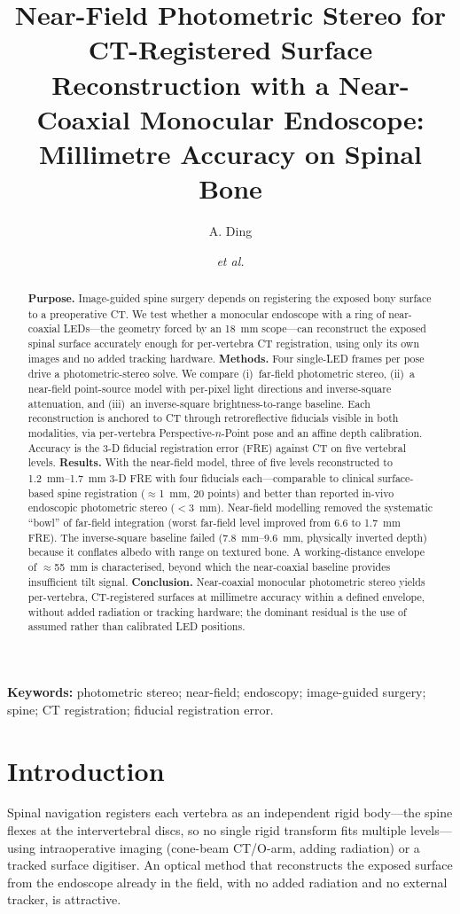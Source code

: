 \documentclass[11pt]{article}
\title{\bfseries Near-Field Photometric Stereo for CT-Registered Surface
Reconstruction with a Near-Coaxial Monocular Endoscope: Millimetre Accuracy on
Spinal Bone}
\author[1]{A. Ding}
\author[1]{\textit{et al.}}
\affil[1]{\small (affiliation to be completed)}
\date{}
\begin{document}
\maketitle

\begin{abstract}
\noindent\textbf{Purpose.} Image-guided spine surgery depends on registering the
exposed bony surface to a preoperative CT. We test whether a monocular endoscope
with a ring of near-coaxial LEDs---the geometry forced by an \SI{18}{\mm} scope---can
reconstruct the exposed spinal surface accurately enough for per-vertebra CT
registration, using only its own images and no added tracking hardware.
\textbf{Methods.} Four single-LED frames per pose drive a photometric-stereo solve.
We compare (i)~far-field photometric stereo, (ii)~a near-field point-source model
with per-pixel light directions and inverse-square attenuation, and (iii)~an
inverse-square brightness-to-range baseline. Each reconstruction is anchored to CT
through retroreflective fiducials visible in both modalities, via per-vertebra
Perspective-$n$-Point pose and an affine depth calibration. Accuracy is the 3-D
fiducial registration error (FRE) against CT on five vertebral levels.
\textbf{Results.} With the near-field model, three of five levels reconstructed to
\SIrange{1.2}{1.7}{\mm} 3-D FRE with four fiducials each---comparable to clinical
surface-based spine registration ($\approx$\SI{1}{\mm}, 20 points) and better than
reported in-vivo endoscopic photometric stereo ($<$\SI{3}{\mm}). Near-field
modelling removed the systematic ``bowl'' of far-field integration (worst far-field
level improved from \num{6.6} to \SI{1.7}{\mm} FRE). The inverse-square baseline
failed (\SIrange{7.8}{9.6}{\mm}, physically inverted depth) because it conflates
albedo with range on textured bone. A working-distance envelope of $\approx$\SI{55}{\mm}
is characterised, beyond which the near-coaxial baseline provides insufficient tilt
signal.
\textbf{Conclusion.} Near-coaxial monocular photometric stereo yields per-vertebra,
CT-registered surfaces at millimetre accuracy within a defined envelope, without
added radiation or tracking hardware; the dominant residual is the use of assumed
rather than calibrated LED positions.
\end{abstract}

\noindent\textbf{Keywords:} photometric stereo; near-field; endoscopy; image-guided
surgery; spine; CT registration; fiducial registration error.

\section{Introduction}
Spinal navigation registers each vertebra as an independent rigid body---the spine
flexes at the intervertebral discs, so no single rigid transform fits multiple
levels---using intraoperative imaging (cone-beam CT/O-arm, adding radiation) or a
tracked surface digitiser. An optical method that reconstructs the exposed surface
from the endoscope already in the field, with no added radiation and no external
tracker, is attractive.
\end{document}
